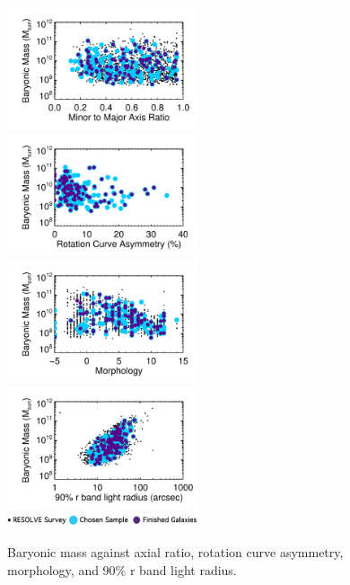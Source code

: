 \documentclass{emulateapj}
\begin{document}
\begin{figure}
\includegraphics[width=0.5\textwidth]{naxisratio-eps-converted-to.pdf}
\includegraphics[width=0.5\textwidth]{nasymHa-eps-converted-to.pdf}
\includegraphics[width=0.5\textwidth]{nmorph-eps-converted-to.pdf}
\includegraphics[width=0.5\textwidth]{nradr90p-eps-converted-to.pdf}
\includegraphics[width=0.5\textwidth]{stuff-Recovered-eps-converted-to.pdf}
\caption{Baryonic mass against axial ratio, rotation curve asymmetry, morphology, and 90\% r band light radius. \label{fig:test}}
\end{figure}
\end{document}
